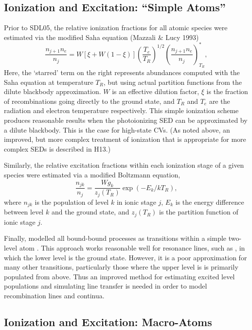 \documentclass[preprint, a4paper, 11pt]{aastex}
\begin{document}
\subsection{Ionization and Excitation: ``Simple Atoms''}
\label{simpleatoms}

Prior to SDL05, the relative ionization fractions for all atomic
species were estimated via the modified Saha equation (Mazzali \&
Lucy 1993)  
\begin{equation}
\frac{n_{j+1} n_e}{n_j} = W [\xi + W(1-\xi)]
\left(\frac{T_e}{T_R}\right)^{1/2}
\left(\frac{n_{j+1}n_e}{n_j}\right)^*_{T_R}, \label{ionization}
\end{equation}
Here, the `starred' term on the right represents abundances computed with
the Saha equation at temperature $T_R$, but using actual partition functions
from the dilute blackbody approximation. 
$W$ is an effective dilution factor, $\xi$ is the
fraction of recombinations going directly to the ground state, and
$T_R$ and $T_e$ are the radiation and electron temperature
respectively. This simple ionization scheme produces reasonable
results when the photoionizing SED can be approximated by a dilute
blackbody. This is the case for high-state CVs. (As noted above, an
improved, but more complex treatment of ionization that is appropriate
for more complex SEDs is described in H13.) 

Similarly, the relative excitation fractions within each ionization
stage of a given species were estimated via a modified Boltzmann
equation,
\begin{equation}
\frac{n_{jk}}{n_j} = \frac{W g_k}{z_j(T_R)} \exp(-E_k/kT_R),
\end{equation}
where $n_{jk}$ is the population of level $k$ in ionic stage $j$,
$E_k$ is the energy difference between level $k$ and the ground state,
and $z_j(T_R)$ is the partition function of ionic stage $j$. 

Finally, \py modelled all bound-bound processes as transitions
within a simple two-level atom \cite[see e.g.][]{mihalas}. This
approach works reasonable well for resonance  
lines, such as \civfull, in which the lower level is the ground state.  
However, it is a poor approximation for many other
transitions, particularly those where the upper level is 
is primarily populated from above. Thus an improved method for
estimating excited level populations and simulating line transfer is
needed in order to model recombination lines and continua.

\subsection{Ionization and Excitation: Macro-Atoms}
\end{document}
